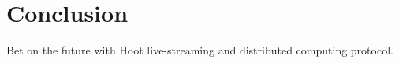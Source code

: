 \documentclass{article}
\begin{document}
\section{Conclusion}
Bet on the future with Hoot live-streaming and distributed computing protocol.




\newpage
\listoffigures
\newpage 
\listoftables
\newpage 

\end{document}
